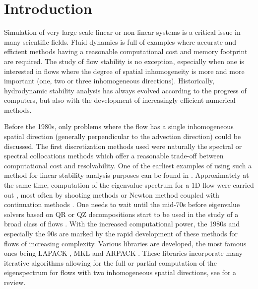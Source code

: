 \section{Introduction}
\label{sec: introduction}

Simulation of very large-scale linear or non-linear systems is a critical issue in many scientific fields. Fluid dynamics is full of examples where accurate and efficient methods having a reasonable computational cost and memory footprint are required. The study of flow stability is no exception, especially when one is interested in flows where the degree of spatial inhomogeneity is more and more important (one, two or three inhomogeneous directions). Historically, hydrodynamic stability analysis has always evolved according to the progress of computers, but also with the development of increasingly efficient numerical methods.

Before the 1980s, only problems where the flow has a single inhomogeneous spatial direction (generally perpendicular to the advection direction) could be discussed. The first discretization methods used were naturally the spectral or spectral collocations methods \cite{PT83, P2002} which offer a reasonable trade-off between computational cost and resolvability. One of the earliest examples of using such a method for linear stability analysis purposes can be found in \cite{J70}. Approximately at the same time, computation of the eigenvalue spectrum for a 1D flow were carried out \cite{J71, GJ75, M1976}, most often by shooting methods or Newton method coupled with continuation methods \cite{M69, DD1969}. One needs to wait until the mid-70s before eigenvalue solvers based on QR or QZ decompositions \cite{BM1984, BM1987, M90} start to be used in the study of a broad class of flows \cite{O1970, GH1970, MZH85, M90}. With the increased computational power, the 1980s and especially the 90s are marked by the rapid development of these methods for flows of increasing complexity. Various libraries are developed, the most famous ones being LAPACK \cite{LAPACK99}, MKL \cite{intelMKL} and ARPACK \cite{LSY97}. These libraries incorporate many iterative algorithms allowing for the full or partial computation of the eigenspectrum for flows with two inhomogeneous spatial directions, see \cite{T2003,T2011} for a review.

